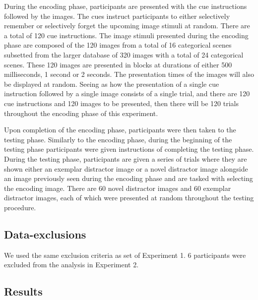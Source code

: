 \documentclass[
  english,
  man,floatsintext]{apa6}
\begin{document}
During the encoding phase, participants are presented with the cue instructions followed by the images. The cues instruct participants to either selectively remember or selectively forget the upcoming image stimuli at random. There are a total of 120 cue instructions. The image stimuli presented during the encoding phase are composed of the 120 images from a total of 16 categorical scenes subsetted from the larger database of 320 images with a total of 24 categorical scenes. These 120 images are presented in blocks at durations of either 500 milliseconds, 1 second or 2 seconds. The presentation times of the images will also be displayed at random. Seeing as how the presentation of a single cue instruction followed by a single image consists of a single trial, and there are 120 cue instructions and 120 images to be presented, then there will be 120 trials throughout the encoding phase of this experiment.

Upon completion of the encoding phase, participants were then taken to the testing phase. Similarly to the encoding phase, during the beginning of the testing phase participants were given instructions of completing the testing phase. During the testing phase, participants are given a series of trials where they are shown either an exemplar distractor image or a novel distractor image alongside an image previously seen during the encoding phase and are tasked with selecting the encoding image. There are 60 novel distractor images and 60 exemplar distractor images, each of which were presented at random throughout the testing procedure.

\hypertarget{data-exclusions}{%
\subsection{Data-exclusions}\label{data-exclusions}}

We used the same exclusion criteria as set of Experiment 1. 6 participants were excluded from the analysis in Experiment 2.

\hypertarget{results-1}{%
\subsection{Results}\label{results-1}}
\end{document}

